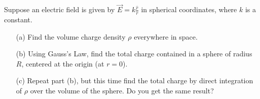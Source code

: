 \documentclass[11pt,letterpaper,boxed]{hmcpset}
\begin{document}
	\begin{solution}
		\vfill
	\end{solution}
	\newpage
	
	
	\begin{problem}[Problem 3*]
		Suppose an electric field is given by $\vec{E} = k
		\frac{\hat r}{r}$ in spherical coordinates, where $k$ is a
		constant.
		
		\begin{enumerate}
			\item [(a)] Find the volume charge density $\rho$ everywhere in space.
			\item [(b)] Using Gauss’s Law, find the total charge contained
			in a sphere of radius $R$, centered at the origin (at $r = 0$).
			\item [(c)] Repeat part (b), but this time find the total
			charge by direct integration of $\rho$ over the volume of the sphere. Do you get the same result?
		\end{enumerate}
			
	\end{problem}
	
	\begin{solution}
		\vfill
	\end{solution}
	\newpage
	
\end{document}
